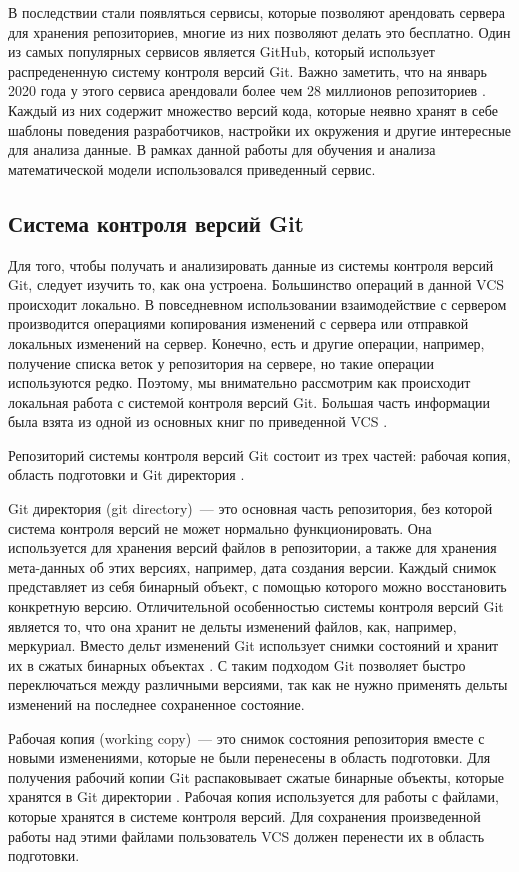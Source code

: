 В последствии стали появляться сервисы, которые позволяют арендовать сервера для хранения репозиториев, многие из них позволяют делать это бесплатно. Один из самых популярных сервисов является GitHub, который использует распредененную систему контроля версий Git. Важно заметить, что на январь 2020 года у этого сервиса арендовали более чем 28 миллионов репозиториев \cite{github-repo-count}. Каждый из них содержит множество версий кода, которые неявно хранят в себе шаблоны поведения разработчиков, настройки их окружения и другие интересные для анализа данные. В рамках данной работы для обучения и анализа математической модели использовался приведенный сервис.
    \subsection{Система контроля версий Git}
Для того, чтобы получать и анализировать данные из системы контроля версий Git, следует изучить то, как она устроена. Большинство операций в данной VCS происходит локально. В повседневном использовании взаимодействие с сервером производится операциями копирования изменений с сервера или отправкой локальных изменений на сервер. Конечно, есть и другие операции, например, получение списка веток у репозитория на сервере, но такие операции используются редко. Поэтому, мы внимательно рассмотрим как происходит локальная работа с системой контроля версий Git. Большая часть информации была взята из одной из основных книг по приведенной VCS \cite{pro-git}.

Репозиторий системы контроля версий Git состоит из трех частей: рабочая копия, область подготовки и Git директория \cite{pro-git}. 

Git директория (git directory)~--- это основная часть репозитория, без которой система контроля версий не может нормально функционировать. Она используется для хранения версий файлов в репозитории, а также для хранения мета-данных об этих версиях, например, дата создания версии. Каждый снимок представляет из себя бинарный объект, с помощью которого можно восстановить конкретную версию. Отличительной особенностью системы контроля версий Git является то, что она хранит не дельты изменений файлов, как, например, меркуриал. Вместо дельт изменений Git использует снимки состояний и хранит их в сжатых бинарных объектах \cite{pro-git}. С таким подходом Git позволяет быстро переключаться между различными версиями, так как не нужно применять дельты изменений на последнее сохраненное состояние.

Рабочая копия (working copy)~--- это снимок состояния репозитория вместе с новыми изменениями, которые не были перенесены в область подготовки. Для получения рабочий копии Git распаковывает сжатые бинарные объекты, которые хранятся в Git директории \cite{pro-git}. Рабочая копия используется для работы с файлами, которые хранятся в системе контроля версий. Для сохранения произведенной работы над этими файлами пользователь VCS должен перенести их в область подготовки.

